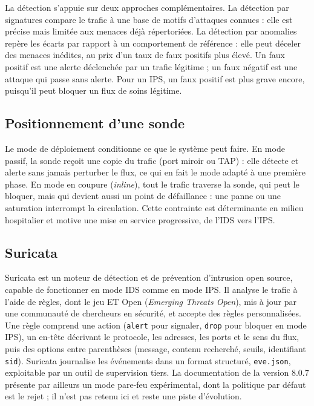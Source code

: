 La détection s'appuie sur deux approches complémentaires. La détection par signatures compare le trafic à une base de motifs d'attaques connues : elle est précise mais limitée aux menaces déjà répertoriées. La détection par anomalies repère les écarts par rapport à un comportement de référence : elle peut déceler des menaces inédites, au prix d'un taux de faux positifs plus élevé\cite{nist80094}. Un faux positif est une alerte déclenchée par un trafic légitime ; un faux négatif est une attaque qui passe sans alerte. Pour un IPS, un faux positif est plus grave encore, puisqu'il peut bloquer un flux de soins légitime.

\subsection{Positionnement d'une sonde}

Le mode de déploiement conditionne ce que le système peut faire. En mode passif, la sonde reçoit une copie du trafic (port miroir ou TAP) : elle détecte et alerte sans jamais perturber le flux, ce qui en fait le mode adapté à une première phase. En mode en coupure (\emph{inline}), tout le trafic traverse la sonde, qui peut le bloquer, mais qui devient aussi un point de défaillance : une panne ou une saturation interrompt la circulation\cite{nist80094}. Cette contrainte est déterminante en milieu hospitalier et motive une mise en service progressive, de l'IDS vers l'IPS.

\subsection{Suricata}

Suricata est un moteur de détection et de prévention d'intrusion open source, capable de fonctionner en mode IDS comme en mode IPS. Il analyse le trafic à l'aide de règles, dont le jeu ET Open (\emph{Emerging Threats Open}), mis à jour par une communauté de chercheurs en sécurité, et accepte des règles personnalisées. Une règle comprend une action (\texttt{alert} pour signaler, \texttt{drop} pour bloquer en mode IPS), un en-tête décrivant le protocole, les adresses, les ports et le sens du flux, puis des options entre parenthèses (message, contenu recherché, seuils, identifiant \texttt{sid}). Suricata journalise les événements dans un format structuré, \texttt{eve.json}, exploitable par un outil de supervision tiers\cite{suricatadoc}. La documentation de la version 8.0.7 présente par ailleurs un mode pare-feu expérimental, dont la politique par défaut est le rejet\cite{suricata} ; il n'est pas retenu ici et reste une piste d'évolution.


